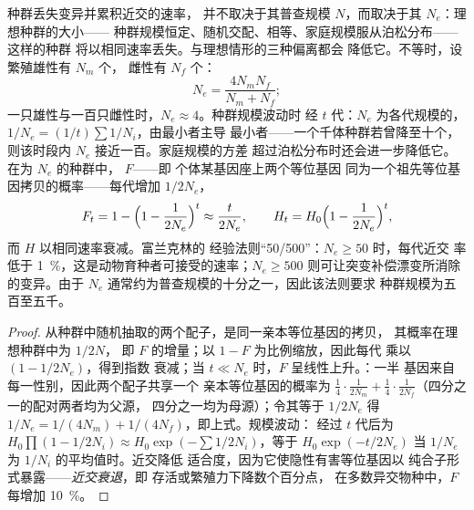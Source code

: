 \begin{theorem}[有效种群大小]\label{thm:b3:conservation-biology:ne}
种群丢失变异并累积近交的速率，
并不取决于其普查规模 $N$，而取决于其
\emph{} $N_{e}$：理想种群的大小——
种群规模恒定、随机交配、相等、家庭规模服从泊松分布——这样的种群
将以相同速率丢失。与理想情形的三种偏离都会
降低它。不等时，设繁殖雄性有 $N_{m}$ 个，
雌性有 $N_{f}$ 个：
\[
N_{e} = \frac{4N_{m}N_{f}}{N_{m} + N_{f}} ;
\]
一只雄性与一百只雌性时，$N_{e} \approx 4$。种群规模波动时
经 $t$ 代：$N_{e}$ 为各代规模的\emph{}，
$1/N_{e} = (1/t)\sum 1/N_{i}$，由最小者主导
最小者——一个千体种群若曾降至十个，
则该时段内 $N_{e}$ 接近一百。家庭规模的方差
超过泊松分布时还会进一步降低它。在为
$N_{e}$ 的种群中，\emph{} $F$——即
个体某基因座上两个等位基因
同为一个祖先等位基因拷贝的概率——每代增加 $1/2N_{e}$，
\[
F_{t} = 1 - \Bigl(1 - \frac{1}{2N_{e}}\Bigr)^{t} \approx \frac{t}{2N_{e}},
\qquad H_{t} = H_{0}\Bigl(1 - \frac{1}{2N_{e}}\Bigr)^{t} ,
\]
而\emph{} $H$ 以相同速率衰减。富兰克林的
经验法则“50/500”：$N_{e} \ge 50$ 时，每代近交
率低于 \qty{1}{\%}，这是动物育种者可接受的速率；$N_{e} \ge
500$ 则可让突变补偿漂变所消除的变异。由于 $N_{e}$
通常约为普查规模的十分之一，因此该法则要求
种群规模为五百至五千。
\end{theorem}
\begin{proof}
从种群中随机抽取的两个配子，是同一亲本等位基因的拷贝，
其概率在理想种群中为 $1/2N$，
即 $F$ 的增量；以 $1 - F$ 为比例缩放，因此每代
乘以 $(1 - 1/2N_{e})$，得到指数
衰减；当 $t \ll N_{e}$ 时，$F$ 呈线性上升。：一半
基因来自每一性别，因此两个配子共享一个
亲本等位基因的概率为 $\tfrac{1}{4}\cdot\tfrac{1}{2N_{m}} +
\tfrac{1}{4}\cdot\tfrac{1}{2N_{f}}$（四分之一的配对两者均为父源，
四分之一均为母源）；令其等于 $1/2N_{e}$
得 $1/N_{e} = 1/(4N_{m}) + 1/(4N_{f})$，即上式。规模波动：
经过 $t$ 代后为 $H_{0}\prod(1 - 1/2N_{i})
\approx H_{0}\exp(-\sum 1/2N_{i})$，等于 $H_{0}\exp(-t/2N_{e})$
当 $1/N_{e}$ 为 $1/N_{i}$ 的平均值时。近交降低
适合度，因为它使隐性有害等位基因以
纯合子形式暴露——\emph{近交衰退}，即
存活或繁殖力下降数个百分点，
在多数异交物种中，$F$ 每增加 \qty{10}{\%}。
\end{proof}

